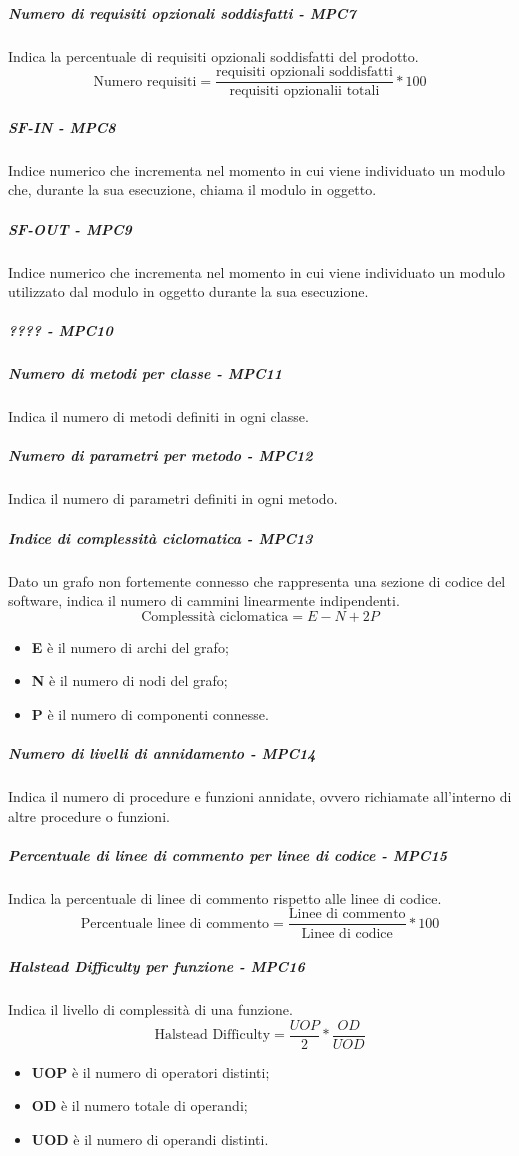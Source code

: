 \subparagraph{Numero di requisiti opzionali soddisfatti - MPC7}
Indica la percentuale di requisiti opzionali soddisfatti del prodotto.
\begin{equation*}
\text{Numero requisiti} = \frac{\text{requisiti opzionali soddisfatti}}{\text{requisiti opzionalii totali}} * 100
\end{equation*}
\subparagraph{SF-IN - MPC8}
Indice numerico che incrementa nel momento in cui viene individuato un modulo che, durante la sua esecuzione, chiama il modulo in oggetto.
\subparagraph{SF-OUT - MPC9}
Indice numerico che incrementa nel momento in cui viene individuato un modulo utilizzato dal modulo in oggetto durante la sua esecuzione.
\subparagraph{???? - MPC10}

\subparagraph{Numero di metodi per classe - MPC11}
Indica il numero di metodi definiti in ogni classe.
\subparagraph{Numero di parametri per metodo - MPC12}
Indica il numero di parametri definiti in ogni metodo.
\subparagraph{Indice di complessità ciclomatica - MPC13}
Dato un grafo non fortemente connesso che rappresenta una sezione di codice del software, indica il numero di cammini linearmente indipendenti.
\begin{equation*}
\text{Complessità ciclomatica} = E - N + 2P
\end{equation*}
\begin{itemize}
	\item \textbf{E} è il numero di archi del grafo;
	\item \textbf{N} è il numero di nodi del grafo;
	\item \textbf{P} è il numero di componenti connesse.
\end{itemize}
\subparagraph{Numero di livelli di annidamento - MPC14}
Indica il numero di procedure e funzioni annidate, ovvero richiamate all'interno di altre procedure o funzioni.
\subparagraph{Percentuale di linee di commento per linee di codice - MPC15}
Indica la percentuale di linee di commento rispetto alle linee di codice.
\begin{equation*}
\text{Percentuale linee di commento} = \frac{\text{Linee di commento}}{\text{Linee di codice}} * 100
\end{equation*}
\subparagraph{Halstead Difficulty per funzione - MPC16}
Indica il livello di complessità di una funzione.
\begin{equation*}
\text{Halstead Difficulty} = \frac{UOP}{2} * \frac{OD}{UOD}
\end{equation*}	
\begin{itemize}
	\item \textbf{UOP} è il numero di operatori distinti;
	\item \textbf{OD} è il numero totale di operandi;
	\item \textbf{UOD} è il numero di operandi distinti.
\end{itemize}
